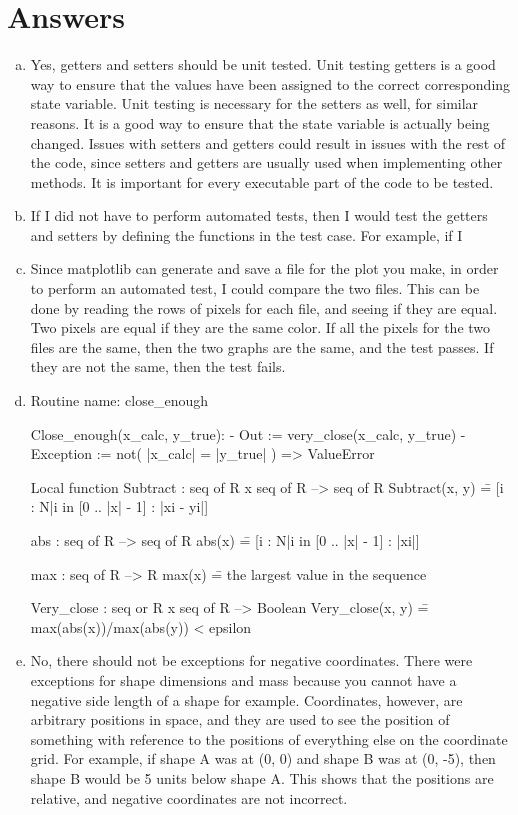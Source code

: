 \documentclass[12pt]{article}
\begin{document}
\section{Answers}

\begin{enumerate}[a)]

\item Yes, getters and setters should be unit tested. Unit testing getters is a good way to ensure that the values have been assigned to the correct corresponding state variable. Unit testing is necessary for the setters as well, for similar reasons. It is a good way to ensure that the state variable is actually being changed. Issues with setters and getters could result in issues with the rest of the code, since setters and getters are usually used when implementing other methods. It is important for every executable part of the code to be tested.

\item If I did not have to perform automated tests, then I would test the getters and setters by defining the functions in the test case. For example, if I 

\item Since matplotlib can generate and save a file for the plot you make, in order to perform an automated test, I could compare the two files. This can be done by reading the rows of pixels for each file, and seeing if they are equal. Two pixels are equal if they are the same color. If all the pixels for the two files are the same, then the two graphs are the same, and the test passes. If they are not the same, then the test fails.

\item Routine name: close_enough


Close_enough(x_calc, y_true):
	- Out := very_close(x_calc, y_true)
	- Exception := not( |x_calc| = |y_true| ) => ValueError

Local function
Subtract : seq of R x seq of R --> seq of R
Subtract(x, y) \== [i : N|i in [0 .. |x| - 1] : |xi - yi|]

abs : seq of R --> seq of R
abs(x) \== [i : N|i in [0 .. |x| - 1] : |xi|]

max : seq of R --> R
max(x) \== the largest value in the sequence

Very_close : seq or R x seq of R --> Boolean
Very_close(x, y) \== max(abs(x))/max(abs(y)) < epsilon

\item No, there should not be exceptions for negative coordinates. There were exceptions for shape dimensions and mass because you cannot have a negative side length of a shape for example. Coordinates, however, are arbitrary positions in space, and they are used to see the position of something with reference to the positions of everything else on the coordinate grid. For example, if shape A was at (0, 0) and shape B was at (0, -5), then shape B would be 5 units below shape A. This shows that the positions are relative, and negative coordinates are not incorrect.


\end{enumerate}
\end{document}
